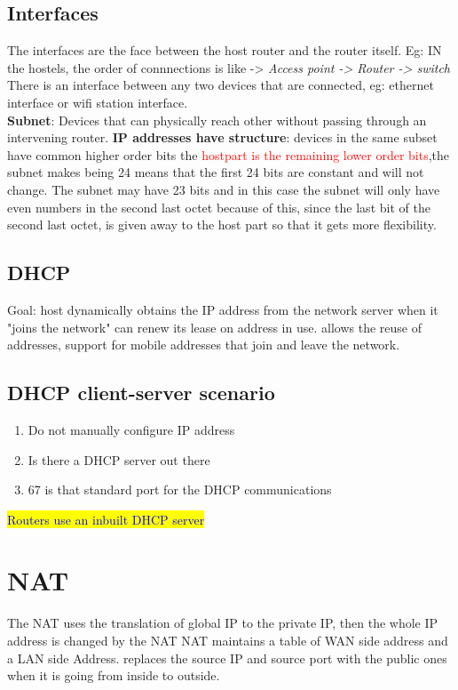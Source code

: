 \subsection{Interfaces} The interfaces are the face between the host router and the router itself.
Eg: IN the hostels, the order of connnections is like -> \textit{Access point -> Router -> switch}
There is an interface between any two devices that are connected, eg: ethernet interface or wifi station interface.
\\
\textbf{Subnet}: Devices that can physically reach other without passing through an intervening router.
\textbf{IP addresses have structure}: devices in the same subset have common higher order bits
the \textcolor{red}{hostpart is the remaining lower order bits},the subnet makes being 24 means that the first 24 bits are constant
and will not change. The subnet \textcolor{BurntOrange}{may have 23 bits and in this case the subnet will only have even numbers} in the second last octet because of this,
since the last bit of the second last octet, is given away to the host part so that it gets more flexibility.

\subsection{DHCP}
Goal: host dynamically obtains the IP address from the network server when it "joins the network" 
can renew its lease on address in use. allows the reuse of addresses, support for mobile addresses that join and leave the network. 

\subsection{DHCP client-server scenario}
\begin{enumerate}
\item Do not manually configure IP address
\item Is there a DHCP server out there
\item 67 is that standard port for the DHCP communications
\end{enumerate}

\colorbox{Yellow}{\textcolor{blue}{Routers use an inbuilt DHCP server}}

\section{NAT}
The NAT uses the translation of global IP to the private IP, 
then the whole IP address is changed by the NAT
NAT maintains a table of WAN side address and a LAN side Address.
replaces the source IP and source port with the public ones when it is going from inside to outside.
